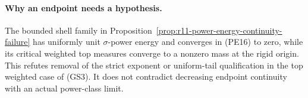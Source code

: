 \paragraph{Why an endpoint needs a hypothesis.}
The bounded shell family in
Proposition~\ref{prop:r11-power-energy-continuity-failure}
has uniformly unit $\sigma$-power energy and converges
in (PE16) to zero, while its critical weighted top
measures converge to a nonzero mass at the rigid
origin. This refutes removal of the strict exponent
or uniform-tail qualification in the top weighted
case of (GS3). It does not contradict decreasing
endpoint continuity with an actual power-class limit.
